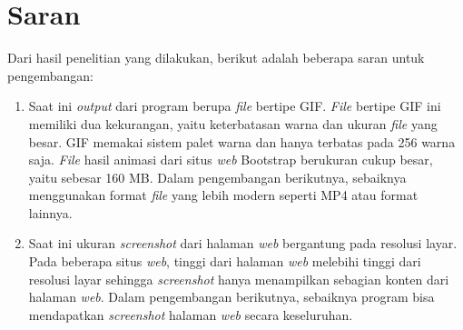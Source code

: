 \section{Saran}
\label{sec:saran}
Dari hasil penelitian yang dilakukan, berikut adalah beberapa saran untuk pengembangan:
\begin{enumerate}
\item Saat ini \textit{output} dari program berupa \textit{file} bertipe GIF. \textit{File} bertipe GIF ini memiliki dua kekurangan, yaitu keterbatasan warna dan ukuran \textit{file} yang besar. GIF memakai sistem palet warna dan hanya terbatas pada 256 warna saja. \textit{File} hasil animasi dari situs \textit{web} Bootstrap berukuran cukup besar, yaitu sebesar 160 MB. Dalam pengembangan berikutnya, sebaiknya menggunakan format \textit{file} yang lebih modern seperti MP4 atau format lainnya. 

 
\item Saat ini ukuran \textit{screenshot} dari halaman \textit{web} bergantung pada resolusi layar. Pada beberapa situs \textit{web}, tinggi dari halaman \textit{web} melebihi tinggi dari resolusi layar sehingga \textit{screenshot} hanya menampilkan sebagian konten dari halaman \textit{web}. Dalam pengembangan berikutnya, sebaiknya program bisa mendapatkan \textit{screenshot} halaman \textit{web} secara keseluruhan.  


 
\end{enumerate}